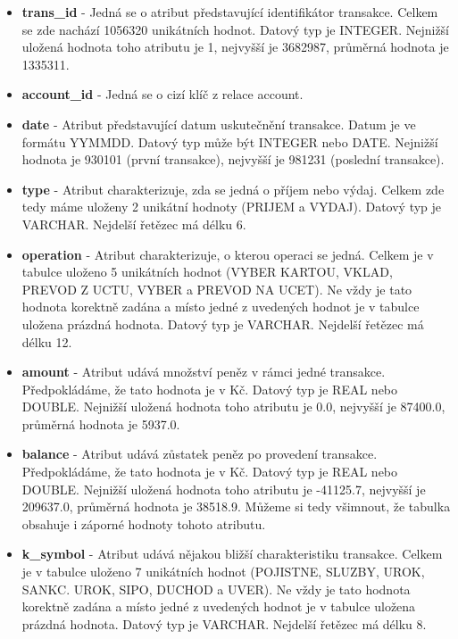 \documentclass{article}
\begin{document}
\begin{itemize}

	\item \textbf{trans\_id} - Jedná se o atribut představující identifikátor transakce. Celkem se zde nachází 1056320 unikátních hodnot. Datový typ je INTEGER. Nejnižší uložená hodnota toho atributu je 1, nejvyšší je 3682987, průměrná hodnota je 1335311.

	\item \textbf{account\_id} - Jedná se o cizí klíč z relace account.
	
	\item \textbf{date} - Atribut představující datum uskutečnění transakce. Datum je ve formátu YYMMDD. Datový typ může být INTEGER nebo DATE. Nejnižší hodnota je 930101 (první transakce), nejvyšší je 981231 (poslední transakce).

	\item \textbf{type} - Atribut charakterizuje, zda se jedná o příjem nebo výdaj. Celkem zde tedy máme uloženy 2 unikátní hodnoty (PRIJEM a VYDAJ). Datový typ je VARCHAR. Nejdelší řetězec má délku 6.
	
	\item \textbf{operation} - Atribut charakterizuje, o kterou operaci se jedná. Celkem je v tabulce uloženo 5 unikátních hodnot (VYBER KARTOU, VKLAD, PREVOD Z UCTU, VYBER a PREVOD NA UCET). Ne vždy je tato hodnota korektně zadána a místo jedné z uvedených hodnot je v tabulce uložena prázdná hodnota. Datový typ je VARCHAR. Nejdelší řetězec má délku 12.
	
	\item \textbf{amount} - Atribut udává množství peněz v rámci jedné transakce. Předpokládáme, že tato hodnota je v Kč. Datový typ je REAL nebo DOUBLE. Nejnižší uložená hodnota toho atributu je 0.0, nejvyšší je 87400.0, průměrná hodnota je 5937.0.

	
	\item \textbf{balance} - Atribut udává zůstatek peněz po provedení transakce. Předpokládáme, že tato hodnota je v Kč. Datový typ je REAL nebo DOUBLE. Nejnižší uložená hodnota toho atributu je -41125.7, nejvyšší je 209637.0, průměrná hodnota je 38518.9. Můžeme si tedy všimnout, že tabulka obsahuje i záporné hodnoty tohoto atributu.

	
	\item \textbf{k\_symbol} - Atribut udává nějakou bližší charakteristiku transakce. Celkem je v tabulce uloženo 7 unikátních hodnot (POJISTNE, SLUZBY, UROK, SANKC. UROK, SIPO, DUCHOD a UVER). Ne vždy je tato hodnota korektně zadána a místo jedné z uvedených hodnot je v tabulce uložena prázdná hodnota. Datový typ je VARCHAR. Nejdelší řetězec má délku 8.
	

\end{itemize}
\end{document}
